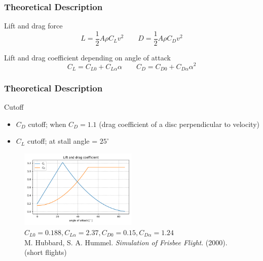 \documentclass{beamer}
\begin{document}

\begin{frame}

\frametitle{Theoretical Description}

\begin{block}{Lift and drag force}
\begin{equation}
L = \dfrac{1}{2} A \rho C_L v^2 \qquad D = \dfrac{1}{2} A \rho C_D v^2
\end{equation}
\end{block}

\begin{block}{Lift and drag coefficient depending on angle of attack \cite{clanek}}
\begin{equation}
C_L = C_{L0} + C_{L \alpha} \alpha \qquad C_D = C_{D0} + C_{D \alpha} \alpha^2
\end{equation}
\end{block}

\end{frame}


\begin{frame}

\frametitle{Theoretical Description}

\begin{block}{Cutoff}
\begin{itemize}
\item $C_D$ cutoff; when $C_D = 1.1$ (drag coefficient of a disc perpendicular to velocity)

\item $C_L$ cutoff; at stall angle = $25^{\circ}$
\end{itemize}
\end{block}

\begin{figure}[H]
	\centering	  \includegraphics[width=0.5\textwidth]{lift_drag_primer.png}
	  \caption{$C_{L0} = 0.188, C_{L \alpha}= 2.37, C_{D0} = 0.15, C_{D \alpha} = 1.24$  \\	M. Hubbard, S. A. Hummel. \textit{Simulation of Frisbee Flight}. (2000). \cite{clanek}  (short flights)}
\end{figure}

\end{frame}
\end{document}
